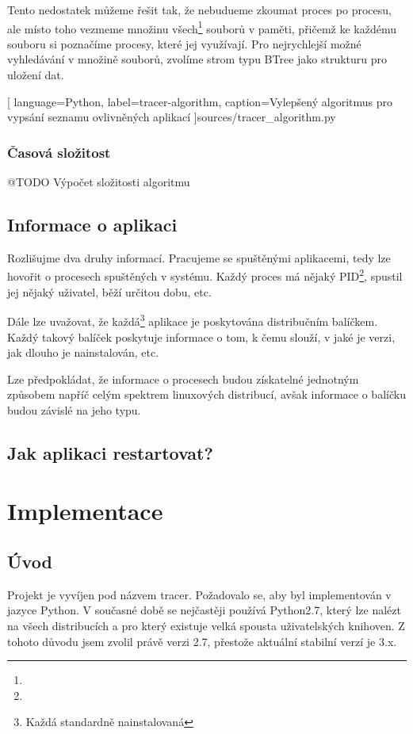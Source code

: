 \documentclass[10pt,a4paper]{article}
\begin{document}
		Tento nedostatek můžeme řešit tak, že nebudueme zkoumat proces po procesu, ale místo toho vezmeme množinu všech\footnote{} souborů v paměti, přičemž ke každému souboru si poznačíme procesy, které jej využívají. Pro nejrychlejší možné vyhledávání v množině souborů, zvolíme strom typu BTree jako strukturu pro uložení dat.

		
		[
			language={Python},
			label=tracer-algorithm,
			caption={Vylepšený algoritmus pro vypsání seznamu ovlivněných aplikací}
		]{sources/tracer_algorithm.py}

			\subsubsection*{Časová složitost}
			@TODO Výpočet složitosti algoritmu

		\subsection{Informace o aplikaci}
		Rozlišujme dva druhy informací. Pracujeme se spuštěnými aplikacemi, tedy lze hovořit o procesech spuštěných v systému. Každý proces má nějaký PID\footnote{}, spustil jej nějaký uživatel, běží určitou dobu, etc.

		Dále lze uvažovat, že každá\footnote{Každá standardně nainstalovaná} aplikace je poskytována distribučním balíčkem. Každý takový balíček poskytuje informace o tom, k čemu slouží, v jaké je verzi, jak dlouho je nainstalován, etc.

		Lze předpokládat, že informace o procesech budou získatelné jednotným způsobem napříč celým spektrem linuxových distribucí, avšak informace o balíčku budou závislé na jeho typu.

		\subsection{Jak aplikaci restartovat?}

	\section{Implementace}
		\subsection{Úvod}
		Projekt je vyvíjen pod názvem tracer. Požadovalo se, aby byl implementován v jazyce Python. V současné době se nejčastěji používá Python2.7, který lze nalézt na všech distribucích a pro který existuje velká spousta uživatelských knihoven. Z tohoto důvodu jsem zvolil právě verzi 2.7, přestože aktuální stabilní verzí je 3.x.
\end{document}
